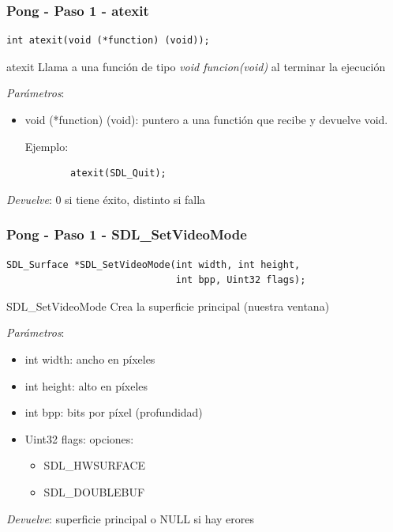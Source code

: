 \begin{frame}[fragile]
    \frametitle{Pong - Paso 1 - atexit}
	
\begin{verbatim}
int atexit(void (*function) (void));
\end{verbatim}

    \begin{block}{atexit}
	Llama a una función de tipo \emph{void funcion(void)} al terminar la ejecución
	
	\emph{Parámetros}:
	\begin{itemize}
	    \item void (*function) (void): puntero a una functión que recibe y devuelve void.
	    
	    Ejemplo:
	    \begin{verbatim}
	    atexit(SDL_Quit);
	    \end{verbatim}
	\end{itemize}
	
	\emph{Devuelve}: $0$ si tiene éxito, distinto si falla
    \end{block}

\end{frame}

\begin{frame}[fragile]
    \frametitle{Pong - Paso 1 - SDL\_SetVideoMode}
	
\begin{verbatim}
SDL_Surface *SDL_SetVideoMode(int width, int height,
                              int bpp, Uint32 flags);
\end{verbatim}

    \begin{block}{SDL\_SetVideoMode}
	Crea la superficie principal (nuestra ventana)
	
	\emph{Parámetros}:
	\begin{itemize}
	    \item int width: ancho en píxeles
	    \item int height: alto en píxeles
	    \item int bpp: bits por píxel (profundidad)
	    \item Uint32 flags: opciones:
	    \begin{itemize}
		    \item SDL\_HWSURFACE
		    \item SDL\_DOUBLEBUF
	    \end{itemize}
	\end{itemize}
	
	\emph{Devuelve}: superficie principal o NULL si hay erores
    \end{block}

\end{frame}

